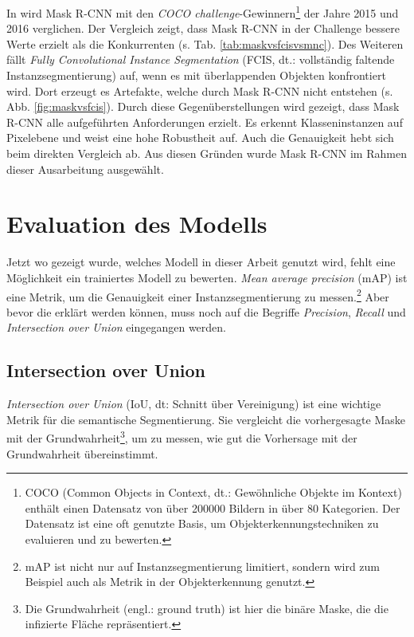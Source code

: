 \noindent
In \cite{ref:maskrcnn} wird Mask R-CNN mit den \textit{COCO challenge}-Gewinnern\footnote{COCO (Common Objects in Context, dt.: Gewöhnliche Objekte im Kontext) enthält einen Datensatz von über 200000 Bildern in über 80 Kategorien. Der Datensatz ist eine oft genutzte Basis, um Objekterkennungstechniken zu evaluieren und zu bewerten.\cite{ref:coco}} der Jahre 2015 und 2016 verglichen. Der Vergleich zeigt, dass Mask R-CNN in der Challenge bessere Werte erzielt als die Konkurrenten (s. Tab. \ref{tab:maskvsfcisvsmnc}). Des Weiteren fällt \textit{Fully Convolutional Instance Segmentation} (FCIS, dt.: vollständig faltende Instanzsegmentierung) auf, wenn es mit überlappenden Objekten konfrontiert wird. Dort erzeugt es Artefakte, welche durch Mask R-CNN nicht entstehen (s. Abb. \ref{fig:maskvsfcis}). Durch diese Gegenüberstellungen wird gezeigt, dass Mask R-CNN alle aufgeführten Anforderungen erzielt. Es erkennt Klasseninstanzen auf Pixelebene und weist eine hohe Robustheit auf. Auch die Genauigkeit hebt sich beim direkten Vergleich ab.\cite[S. 5ff.]{ref:maskrcnn} Aus diesen Gründen wurde Mask R-CNN im Rahmen dieser Ausarbeitung ausgewählt.

\section{Evaluation des Modells}\label{sec:map}

Jetzt wo gezeigt wurde, welches Modell in dieser Arbeit genutzt wird, fehlt eine Möglichkeit ein trainiertes Modell zu bewerten. \textit{Mean average precision} (mAP) ist eine Metrik, um die Genauigkeit einer Instanzsegmentierung zu messen.\footnote{mAP ist nicht nur auf Instanzsegmentierung limitiert, sondern wird zum Beispiel auch als Metrik in der Objekterkennung genutzt.} Aber bevor die erklärt werden können, muss noch auf die Begriffe \textit{Precision}, \textit{Recall} und \textit{Intersection over Union} eingegangen werden. 


\subsection{Intersection over Union}

\textit{Intersection over Union} (IoU, dt: Schnitt über Vereinigung) ist eine wichtige Metrik für die semantische Segmentierung. Sie vergleicht die vorhergesagte Maske mit der Grundwahrheit\footnote{Die Grundwahrheit (engl.: ground truth) ist hier die binäre Maske, die die infizierte Fläche repräsentiert.}, um zu messen, wie gut die Vorhersage mit der Grundwahrheit übereinstimmt.\cite{ref:map}

